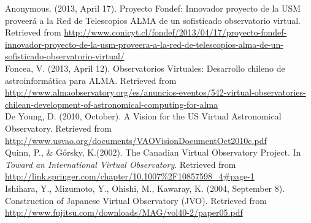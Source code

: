 \documentclass[10pt]{article}
\begin{document}
Anonymous. (2013, April 17). Proyecto Fondef: Innovador proyecto de la USM
proveer\'{a} a la Red de Telescopios ALMA de un sofisticado observatorio
virtual. Retrieved from
\url{http://www.conicyt.cl/fondef/2013/04/17/proyecto-fondef-innovador-proyecto-de-la-usm-proveera-a-la-red-de-telescopios-alma-de-un-sofisticado-observatorio-virtual/}\\

Foncea, V. (2013, April 12). Observatorios Virtuales: Desarrollo chileno de
astroinform\'{a}tica para ALMA. Retrieved from
\url{http://www.almaobservatory.org/es/anuncios-eventos/542-virtual-observatories-chilean-development-of-astronomical-computing-for-alma}\\

De Young, D. (2010, October). A Vision for the US Virtual Astronomical
Observatory. Retrieved from
\url{http://www.usvao.org/documents/VAOVisionDocumentOct2010c.pdf}\\

		Quinn, P., \& G\'{o}rsky, K.(2002). The Canadian Virtual Observatory
Project. In \textit{Toward an International Virtual Observatory}. Retrieved
from \url{http://link.springer.com/chapter/10.1007%2F10857598_4#page-1}\\

Ishihara, Y., Mizumoto, Y., Ohishi, M., Kawaray, K. (2004, September 8).
Construction of Japanese Virtual Observatory (JVO). Retrieved from
\url{http://www.fujitsu.com/downloads/MAG/vol40-2/paper05.pdf}\\
\end{document}
